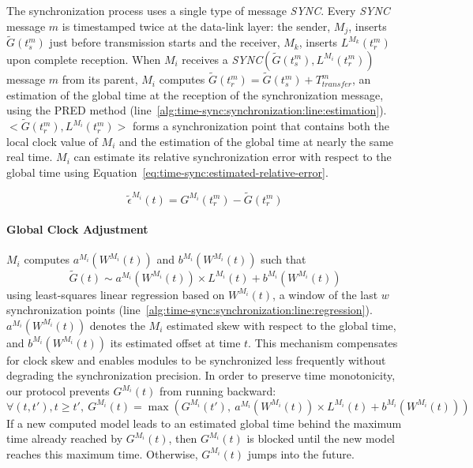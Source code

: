 The synchronization process uses a single type of message \textit{SYNC}. Every \textit{SYNC} message $m$ is timestamped twice at the data-link layer: the sender, ${M_j}$, inserts $\tilde{G}(t_s^{m})$ just before transmission starts and the receiver, ${M_k}$, inserts $L^{M_k}(t_r^{m})$ upon complete reception. When ${M_i}$ receives a \textit{SYNC}$(\tilde{G}(t_s^{m}),L^{M_i}(t_r^{m}))$ message $m$ from its parent, ${M_i}$ computes $\tilde{G}(t_r^{m}) = \tilde{G}(t_s^{m}) + T_{transfer}^{m}$, an estimation of the global time at the reception of the synchronization message, using the PRED method (line~\ref{alg:time-sync:synchronization:line:estimation}). $<\!\tilde{G}(t_r^{m}),L^{M_i}{(t_r^{m})}\!>$ forms a synchronization point that contains both the local clock value of $M_i$ and the estimation of the global time at nearly the same real time. ${M_i}$ can estimate its relative synchronization error with respect to the global time using Equation~\eqref{eq:time-sync:estimated-relative-error}.

\begin{equation}
	\label{eq:time-sync:estimated-relative-error}
	\tilde{\epsilon}^{M_i}(t) = G^{M_i}(t_r^{m}) - \tilde{G}(t_r^{m})
\end{equation}

\paragraph{Global Clock Adjustment}

$M_i$ computes $a^{M_i}(W^{M_i}(t))$ and $b^{M_i}(W^{M_i}(t))$ such that
\begin{equation}
\tilde{G}(t) \sim a^{M_i}(W^{M_i}(t))\times L^{M_i}(t) + b^{M_i}(W^{M_i}(t))
\end{equation}
using least-squares linear regression based on $W^{M_i}(t)$, a window of the last $w$ synchronization points (line~\ref{alg:time-sync:synchronization:line:regression}). $a^{M_i}(W^{M_i}(t))$ denotes the $M_i$ estimated skew with respect to the global time, and $b^{M_i}(W^{M_i}(t))$ its estimated offset at time $t$. This mechanism compensates for clock skew and enables modules to be synchronized less frequently without degrading the synchronization precision. In order to preserve time monotonicity, our protocol prevents $G^{M_i}(t)$ from running backward: 
\begin{equation}
\forall (t, t'), t \geq t', \ G^{M_i}(t) = \max{\left(G^{M_i}(t'),\ a^{M_i}\left(W^{M_i}(t)\right)\times L^{M_i}(t) + b^{M_i}\left(W^{M_i}(t)\right)\right)}
\end{equation}
If a new computed model leads to an estimated global time behind the maximum time already reached by $G^{M_i}(t)$, then $G^{M_i}(t)$ is blocked until the new model reaches this maximum time. Otherwise, $G^{M_i}(t)$ jumps into the future.

